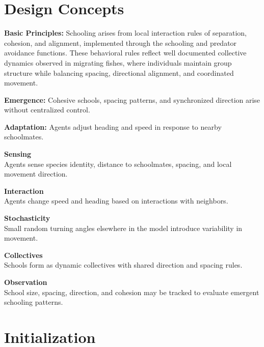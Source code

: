\documentclass[
]{book}
\begin{document}
\section{Design Concepts}\label{design-concepts-9}

\textbf{Basic Principles:} Schooling arises from local interaction rules of
separation, cohesion, and alignment, implemented through the schooling
and predator avoidance functions\citep{dobon_netlogo_2018}. These behavioral
rules reflect well documented collective dynamics observed in migrating
fishes, where individuals maintain group structure while balancing
spacing, directional alignment, and coordinated movement.

\textbf{Emergence:} Cohesive schools, spacing patterns, and synchronized
direction arise without centralized control.

\textbf{Adaptation:} Agents adjust heading and speed in response to nearby
schoolmates.

\textbf{Sensing}\\
Agents sense species identity, distance to schoolmates, spacing, and
local movement direction.

\textbf{Interaction}\\
Agents change speed and heading based on interactions with neighbors.

\textbf{Stochasticity}\\
Small random turning angles elsewhere in the model introduce variability
in movement.

\textbf{Collectives}\\
Schools form as dynamic collectives with shared direction and spacing
rules.

\textbf{Observation}\\
School size, spacing, direction, and cohesion may be tracked to evaluate
emergent schooling patterns.

\section{Initialization}\label{initialization-9}
\end{document}
